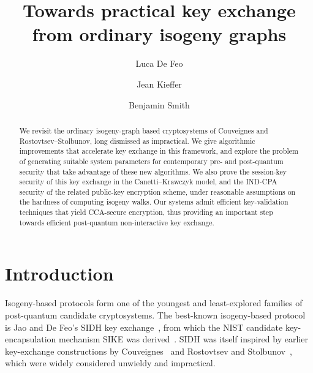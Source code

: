 \documentclass{llncs}
\begin{document}
\title{Towards practical key exchange\\ from ordinary isogeny graphs}
\author{
 Luca De Feo \and
 Jean Kieffer \and
 Benjamin Smith
}

\maketitle

\begin{abstract}
    We revisit the ordinary isogeny-graph based cryptosystems
    of Couveignes and Rostovtsev--Stolbunov,
    long dismissed as impractical.
    We give algorithmic improvements that accelerate key exchange
    in this framework,
    and explore the problem of generating suitable system parameters
    for contemporary pre- and post-quantum security that take
		advantage of these new algorithms.
    We also prove the session-key security of this key exchange
    in the Canetti--Krawczyk model,
    and the IND-CPA security of the related public-key encryption scheme,
    under reasonable assumptions on the hardness of computing isogeny walks.
    Our systems admit efficient key-validation techniques that
    yield CCA-secure encryption,
    thus providing an important step towards
    efficient post-quantum non-interactive key exchange.

\end{abstract}

\section{Introduction}
\label{sec:introduction}

Isogeny-based protocols
form one of the youngest and least-explored
families of post-quantum candidate cryptosystems.
The best-known isogeny-based protocol
is Jao and De Feo's SIDH key exchange~\cite{jao+defeo2011},
from which the NIST candidate key-encapsulation mechanism
SIKE was derived~\cite{SIKE,NIST2016}.
SIDH was itself inspired by earlier
key-exchange constructions
by Couveignes~\cite{cryptoeprint:2006:291}
and Rostovtsev and
Stolbunov~\cite{rostovtsev+stolbunov06,stolbunov-red,Stol},
which were widely considered unwieldy and impractical.
\end{document}
